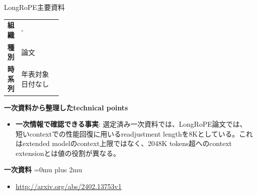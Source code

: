 \Needspace{0.38\textheight}
\begin{technicalnote}{LongRoPE}{主要資料}
\begingroup
\begin{tabularx}{\linewidth}{@{}>{\bfseries}p{0.22\linewidth}X@{}}
組織 & - \\
種別 & 論文 \\
時系列 & 年表対象日付なし \\
\end{tabularx}
\smallskip
\begin{minipage}{\linewidth}
{\bfseries 一次資料から整理したtechnical points}
\begin{itemize}[leftmargin=1.5em,itemsep=0.35em]
\item \textbf{一次情報で確認できる事実}: 選定済み一次資料では、LongRoPE論文では、短いcontextでの性能回復に用いるreadjustment lengthを8Kとしている。これはextended modelのcontext上限ではなく、2048K tokens超へのcontext extensionとは値の役割が異なる。
\end{itemize}
\begin{minipage}{\linewidth}
\begin{samepage}
{\bfseries 一次資料}
\begingroup\sloppy
\Urlmuskip=0mu plus 2mu\relax
\begin{itemize}[leftmargin=1.5em,itemsep=0.25em]
\item {\scriptsize\url{http://arxiv.org/abs/2402.13753v1}}
\end{itemize}
\endgroup
\end{samepage}
\end{minipage}
\end{minipage}
\endgroup
\end{technicalnote}
\medskip

